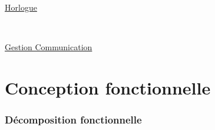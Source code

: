 \documentclass[11pt, french]{article} %
\begin{document}
\vspace{0.2in}
\underline{Horlogue}

\begin{minipage}[t, h]{8cm}

\end{minipage}
~
\begin{minipage}[t, h]{8cm}

\end{minipage}

\pagebreak
\begin{landscape}
\begin{center}
\vspace{0.2in}
\underline{Gestion Communication}


\end{center}
\end{landscape}


\part{Conception fonctionnelle}


\section{Décomposition fonctionnelle}

\pagebreak
\begin{landscape}
\begin{center}

\end{center}
\end{landscape}
\end{document}
